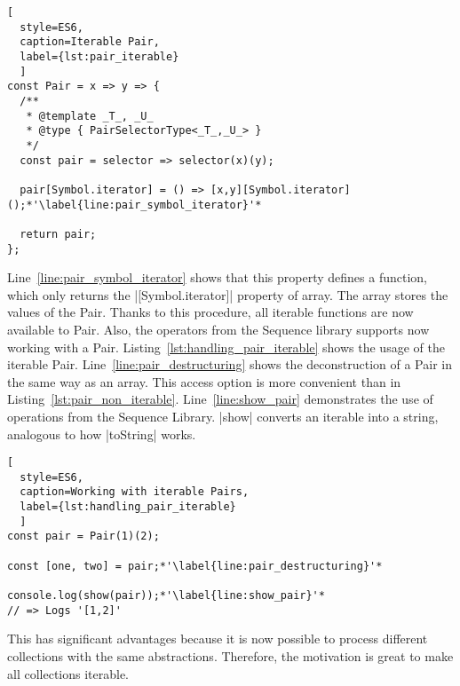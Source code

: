 \begin{lstlisting}[
  style=ES6, 
  caption=Iterable Pair,
  label={lst:pair_iterable}
  ]
const Pair = x => y => {
  /**
   * @template _T_, _U_
   * @type { PairSelectorType<_T_,_U_> }
   */
  const pair = selector => selector(x)(y);

  pair[Symbol.iterator] = () => [x,y][Symbol.iterator]();*'\label{line:pair_symbol_iterator}'*

  return pair;
};
\end{lstlisting}

Line~\ref{line:pair_symbol_iterator} shows that 
this property defines a function, which only returns the |[Symbol.iterator]| 
property of array. The array stores the values of the Pair. Thanks to this 
procedure, all iterable functions are now available to Pair. Also, the 
operators from the Sequence library supports now working with a Pair.
Listing~\ref{lst:handling_pair_iterable} shows the usage of the iterable Pair. 
Line~\ref{line:pair_destructuring} shows the deconstruction of a Pair in the same way as an array. 
This access option is more convenient than in Listing~\ref{lst:pair_non_iterable}. 
Line~\ref{line:show_pair} demonstrates the use of operations from the Sequence 
Library. |show| converts an iterable into a string, analogous to how |toString|
works.

\begin{lstlisting}[
  style=ES6, 
  caption=Working with iterable Pairs,
  label={lst:handling_pair_iterable}
  ]
const pair = Pair(1)(2);

const [one, two] = pair;*'\label{line:pair_destructuring}'*

console.log(show(pair));*'\label{line:show_pair}'*
// => Logs '[1,2]'
\end{lstlisting}

This has significant advantages because it is now possible to process different 
collections with the same abstractions. Therefore, the motivation is great to 
make all collections iterable.


